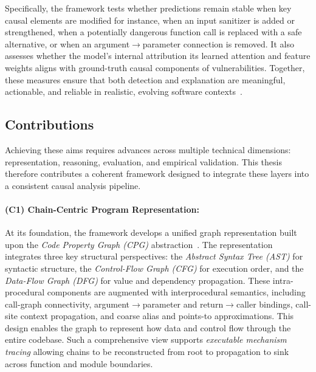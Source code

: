 \documentclass{buthesis}
\begin{document}
Specifically, the framework tests whether predictions remain stable when key causal elements are modified for instance, when an input sanitizer is added or strengthened, when a potentially dangerous function call is replaced with a safe alternative, or when an argument$\rightarrow$parameter connection is removed. It also assesses whether the model’s internal attribution its learned attention and feature weights aligns with ground-truth causal components of vulnerabilities. Together, these measures ensure that both detection and explanation are meaningful, actionable, and reliable in realistic, evolving software contexts~\cite{Cao2024ICSE,Chu2024ISSTA}.

\subsection{Contributions}

Achieving these aims requires advances across multiple technical dimensions: representation, reasoning, evaluation, and empirical validation. This thesis therefore contributes a coherent framework designed to integrate these layers into a consistent causal analysis pipeline.

\paragraph{(C1) Chain-Centric Program Representation:}
At its foundation, the framework develops a unified graph representation built upon the \emph{Code Property Graph (CPG)} abstraction~\cite{yamaguchi2014cpg}. The representation integrates three key structural perspectives: the \emph{Abstract Syntax Tree (AST)} for syntactic structure, the \emph{Control-Flow Graph (CFG)} for execution order, and the \emph{Data-Flow Graph (DFG)} for value and dependency propagation. These intra-procedural components are augmented with interprocedural semantics, including call-graph connectivity, argument$\rightarrow$parameter and return$\rightarrow$caller bindings, call-site context propagation, and coarse alias and points-to approximations. This design enables the graph to represent how data and control flow through the entire codebase. Such a comprehensive view supports \emph{executable mechanism tracing} allowing chains to be reconstructed from root to propagation to sink across function and module boundaries.
\end{document}
